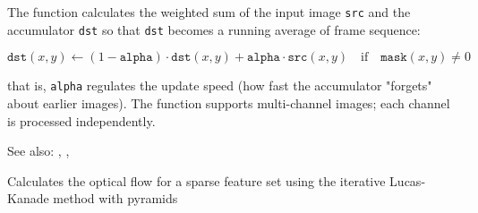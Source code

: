 The function calculates the weighted sum of the input image
\texttt{src} and the accumulator \texttt{dst} so that \texttt{dst}
becomes a running average of frame sequence:

\[ \texttt{dst}(x,y) \leftarrow (1-\texttt{alpha}) \cdot \texttt{dst}(x,y) + \texttt{alpha} \cdot \texttt{src}(x,y) \quad \text{if} \quad \texttt{mask}(x,y) \ne 0 \]

that is, \texttt{alpha} regulates the update speed (how fast the accumulator "forgets" about earlier images).
The function supports multi-channel images; each channel is processed independently.

See also: , , 

Calculates the optical flow for a sparse feature set using the iterative Lucas-Kanade method with pyramids


